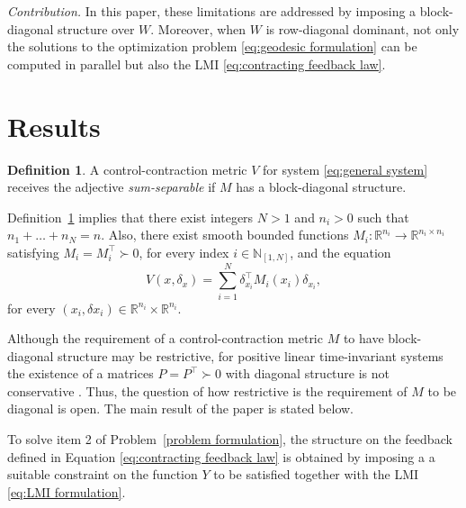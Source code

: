 \documentclass[10pt,twocolumn,twoside]{IEEEtran}
\theoremstyle{plain}
\theoremstyle{definition}
\newtheorem{definition}[theorem]{Definition}
\theoremstyle{remark}
\begin{document}
{\itshape Contribution.} In this paper, these limitations are addressed by imposing a block-diagonal structure over $W$. Moreover, when $W$ is row-diagonal dominant, not only the solutions to the optimization problem \eqref{eq:geodesic formulation} can be computed in parallel but also the LMI \eqref{eq:contracting feedback law}.

\section{Results}\label{sec:Results}

\begin{definition}\label{def:SSCCM}
	A control-contraction metric $V$ for system \eqref{eq:general system} receives the adjective \emph{sum-separable} if $M$ has a block-diagonal structure. 
\end{definition}

Definition~\ref{def:SSCCM} implies that there exist integers $N>1$ and $n_i>0$ such that $n_1+\ldots+n_N=n$. Also, there exist smooth bounded functions $M_i:\mathbb{R}^{n_i}\to\mathbb{R}^{n_i\times n_i}$ satisfying $M_i=M_i^\top\succ0$, for every index $i\in\mathbb{N}_{[1,N]}$, and the equation
	\begin{equation*}
		V(x,\delta_x)=\sum_{i=1}^N \delta_{x_i}^\top M_i(x_i)\delta_{x_i},
	\end{equation*}
for every $(x_i,\delta x_i)\in\mathbb{R}^{n_i}\times\mathbb{R}^{n_i}$.

Although the requirement of a control-contraction metric $M$ to have block-diagonal structure may be restrictive, for positive linear time-invariant systems the existence of a matrices $P=P^\top\succ0$ with diagonal structure is not conservative \cite{Tanaka2011}. Thus, the question of how restrictive is the requirement of $M$ to be diagonal is open. The main result of the paper is stated below.


To solve item 2 of Problem~\ref{problem formulation}, the structure on the feedback defined in Equation \eqref{eq:contracting feedback law} is obtained by imposing a a suitable constraint on the function $Y$ to be satisfied together with the LMI \eqref{eq:LMI formulation}. 
\end{document}
